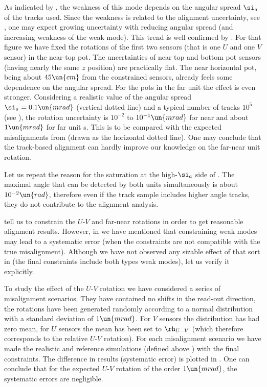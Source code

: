 As indicated by , the weakness of this mode depends on the angular spread $\si_a$ of the tracks used. Since the weakness is related to the alignment uncertainty, see , one may expect growing uncertainty with reducing angular spread (and increasing weakness of the weak mode). This trend is well confirmed by . For that figure we have fixed the rotations of the first two sensors (that is one $U$ and one $V$ sensor) in the near-top pot. The uncertainties of near top and bottom pot sensors (having nearly the same $z$ position) are practically flat. The near horizontal pot, being about $45\un{cm}$ from the constrained sensors, already feels some dependence on the angular spread. For the pots in the far unit the effect is even stronger. Considering a realistic value of the angular spread $\si_a =  0.1\un{mrad}$ (vertical dotted line) and a typical number of tracks $10^5$ (see ), the rotation uncertainty is $10^{-2}$ to $10^{-1}\un{mrad}$ for near and about $1\un{mrad}$ for far unit s. This is to be compared with the expected misalignments from  (drawn as the horizontal dotted line). One may conclude that the track-based alignment can hardly improve our knowledge on the far-near unit rotation.

Let us repeat the reason for the saturation at the high-$\si_a$ side of . The maximal angle that can be detected by both units simultaneously is about $10^{-2}\un{rad}$, therefore even if the track sample includes higher angle tracks, they do not contribute to the alignment analysis.

 tell us to constrain the $U$-$V$ and far-near rotations in order to get reasonable alignment results. However, in  we have mentioned that constraining weak modes may lead to a systematic error (when the constraints are not compatible with the true misalignment). Although we have not observed any sizable effect of that sort in  (the final constraints include both types weak modes), let us verify it explicitly.

To study the effect of the $U$-$V$ rotation we have considered a series of misalignment scenarios. They have contained no shifts in the read-out direction, the rotations have been generated randomly according to a normal distribution with a standard deviation of $1\un{mrad}$. For $V$ sensors the distribution has had zero mean, for $U$ sensors the mean has been set to $\rh_{U-V}$ (which therefore corresponds to the relative $U$-$V$ rotation). For each misalignment scenario we have made the realistic and reference simulations (defined above ) with the final constraints. The difference in results (systematic error) is plotted in . One can conclude that for the expected $U$-$V$ rotation of the order $1\un{mrad}$, the systematic errors are negligible.

